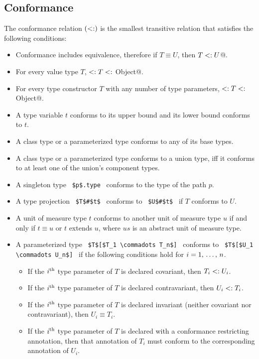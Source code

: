 \subsection{Conformance}
\label{sec:conformance}

The conformance relation $(<:)$ is the smallest transitive relation that satisfies the following conditions:

\begin{itemize}

\item
Conformance includes equivalence, therefore if $T \equiv U$, then \lstinline@$T <: U$@. 

\item
For every value type $T$, \lstinline@Nothing $<: T <:$ Object@. 

\item
For every type constructor $T$ with any number of type parameters, \lstinline@Nothing $<: T <:$ Object@. 

\item
A type variable $t$ conforms to its upper bound and its lower bound conforms to $t$. 

\item
A class type or a parameterized type conforms to any of its base types. 

\item
A class type or a parameterized type conforms to a union type, iff it conforms to at least one of the union's component types. 

\item 
A singleton type ~\lstinline!$p$.type!~ conforms to the type of the path $p$.

\item
A type projection ~\lstinline!$T$#$t$!~ conforms to ~\lstinline!$U$#$t$!~ if $T$ conforms to $U$. 

\item
A unit of measure type $t$ conforms to another unit of measure type $u$ if and only if $t \equiv u$ or $t$ extends $u$, where $us$ is an abstract unit of measure type. 

\item 
A parameterized type ~\lstinline!$T$[$T_1 \commadots T_n$]!~ conforms to ~\lstinline!$T$[$U_1 \commadots U_n$]!~ if the following conditions hold for $i = 1 ,\, \ldots ,\, n$.
  \begin{itemize}
  \item If the $i^{\mbox{\scriptsize th}}$ type parameter of $T$ is declared covariant, then $T_i <: U_i$.
  \item If the $i^{\mbox{\scriptsize th}}$ type parameter of $T$ is declared contravariant, then $U_i <: T_i$.
  \item If the $i^{\mbox{\scriptsize th}}$ type parameter of $T$ is declared invariant (neither covariant nor contravariant), then $U_i \equiv T_i$.
  \item If the $i^{\mbox{\scriptsize th}}$ type parameter of $T$ is declared with a conformance restricting annotation, then that annotation of $T_i$ must conform to the corresponding annotation of $U_i$. 
  \end{itemize}


\end{itemize}
